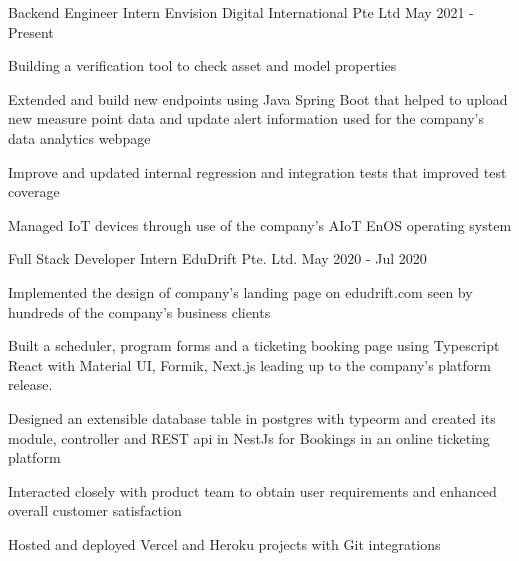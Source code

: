 

\begin{cventries}

  \cventry
    {Backend Engineer Intern} %
    {Envision Digital International Pte Ltd} %
    {} %
    {May 2021 - Present} %
    {
      \begin{cvitems} %
        \item {Building a verification tool to check asset and model properties}
        \item {Extended and build new endpoints using Java Spring Boot that helped to upload new measure point data and update alert information used for the company's data analytics webpage}
        \item {Improve and updated internal regression and integration tests that improved test coverage}
        \item {Managed IoT devices through use of the company's AIoT EnOS operating system}
      \end{cvitems}
    }

  \cventry
    {Full Stack Developer Intern} %
    {EduDrift Pte. Ltd.} %
    {} %
    {May 2020 - Jul 2020} %
    {
      \begin{cvitems} %
        \item {Implemented the design of company's landing page on \textcolor{eduDft-darkblue}{edudrift.com} seen by hundreds of the company's business clients}
        \item {Built a scheduler, program forms and a ticketing booking page using Typescript React with Material UI, Formik, Next.js leading up to the company's platform release.}
        \item {Designed an extensible database table in postgres with typeorm and created its module, controller and REST api in NestJs for Bookings in an online ticketing platform}
        \item {Interacted closely with product team to obtain user requirements and enhanced overall customer satisfaction}
        \item {Hosted and deployed Vercel and Heroku projects with Git integrations}
      \end{cvitems}
    }

\end{cventries}
